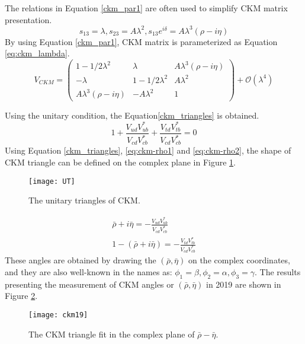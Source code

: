 The relations in Equation \ref{ckm_par1} are often used to simplify CKM matrix presentation.
\begin{equation}\label{ckm_par1}
s_{13}=\lambda , s_{23}=A\lambda^2, s_{13}e^{i\delta}=A\lambda^3(\rho-i\eta)
\end{equation}
By using Equation \ref{ckm_par1}, CKM matrix is parameterized as Equation \ref{eq:ckm_lambda}.
\begin{equation}\label{eq:ckm_lambda}
V_{CKM}=
\begin{pmatrix}
1-1/2\lambda^2 & \lambda & A\lambda^3(\rho-i\eta)\\
-\lambda & 1-1/2\lambda^2 & A\lambda^2\\
A\lambda^3(\rho-i\eta) & -A\lambda^2 & 1
\end{pmatrix}+\mathcal{O}(\lambda^4)
\end{equation}

Using the unitary condition, the Equation\ref{ckm_triangles} is obtained.
\begin{equation}\label{ckm_triangles}
1+
\frac{V_{ud}V^*_{ub}}{V_{cd}V^*_{cb}}+
\frac{V_{td}V^*_{tb}}{V_{cd}V^*_{cb}}
=0
\end{equation}
Using Equation \ref{ckm_triangles}, \ref{eq:ckm-rho1} and \ref{eq:ckm-rho2}, the shape of CKM triangle can be defined on the complex plane in Figure \ref{fig:ckm_angles}.
\begin{figure}[htpb]
	\centering
	\texttt{[image: UT]}
	\caption{The unitary triangles of CKM\cite{ckmfitter}.}
	\label{fig:ckm_angles}
\end{figure}
\begin{eqnarray}
\bar{\rho}+i\bar{\eta}=- \frac{V_{ud}V^*_{ub}}{V_{cd}V^*_{cb}}\label{eq:ckm-rho1}\\
1-(\bar{\rho}+i\bar{\eta})=-\frac{V_{td}V^*_{tb}}{V_{cd}V^*_{cb}}\label{eq:ckm-rho2}
\end{eqnarray}
These angles are obtained by drawing the $(\bar{\rho},\bar{\eta})$ on the complex coordinates, and they are also well-known in the names as: $\phi_1=\beta,\phi_2=\alpha,\phi_3=\gamma$. The results presenting the measurement of CKM angles or $(\bar{\rho},\bar{\eta})$ in 2019 are shown in Figure \ref{fig:ckm19}.
\begin{figure}[htbp]
	\centering
	\texttt{[image: ckm19]}
	\caption{The CKM triangle fit in the complex plane of $\bar{\rho}-\bar{\eta}$.\cite{ckmfitter}}
	\label{fig:ckm19}
\end{figure}

